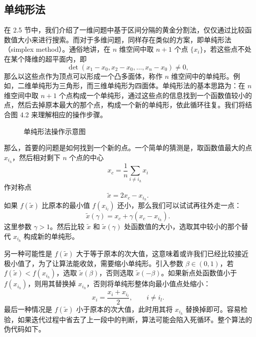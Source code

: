 \subsection{单纯形法}

在 2.5 节中，我们介绍了一维问题中基于区间分隔的黄金分割法，仅仅通过比较函数值大小来进行搜索。而对于多维问题，同样存在类似的方案，即单纯形法（simplex method）。通俗地讲，在 $n$ 维空间中取 $n+1$ 个点 $\{x_i\}$，若这些点不处在某个降维的超平面内，即
\[
\det(x_1-x_0,x_2-x_0,\ldots,x_n-x_0)\ne0,
\]
那么以这些点作为顶点可以形成一个凸多面体，称作 $n$ 维空间中的单纯形。例如，二维单纯形为三角形，而三维单纯形为四面体。单纯形法的基本思路为：在 $n$ 维空间中取 $n+1$ 个点构成一个单纯形，通过这些点的信息找到一个函数值较小的点，然后去掉原本最大的那个点，构成一个新的单纯形，依此循环往复。我们将结合图 4.2 来理解相应的操作步骤。

\begin{figure}[htbp]
\centering
{}
\caption{单纯形法操作示意图}
\label{fig:simplex-operations}
\end{figure}

那么，首要的问题是如何找到一个新的点。一个简单的猜测是，取函数值最大的点 $x_{i_h}$，然后相对剩下 $n$ 个点的中心
\[
x_c=\frac1n\sum_{i\ne i_h}x_i
\]
作对称点
\begin{equation}
\tilde x=2x_c-x_{i_h}.
\tag{4.1.25}
\end{equation}
如果 $f(\tilde x)$ 比原本的最小值 $f(x_{i_l})$ 还小，那么我们可以试试再往外走一点：
\begin{equation}
\tilde x(\gamma)=x_c+\gamma(x_c-x_{i_h}).
\tag{4.1.26}
\end{equation}
这里参数 $\gamma>1$。然后比较 $\tilde x$ 和 $\tilde x(\gamma)$ 处函数值的大小，选取其中较小的那个替代 $x_{i_h}$ 构成新的单纯形。

另一种可能性是 $f(\tilde x)$ 大于等于原本的次大值，这意味着或许我们已经比较接近极小值了，为了让算法能收敛，需要缩小单纯形。引入参数 $\beta\in(0,1)$，若 $f(\tilde x)<f(x_{i_h})$，选取 $\tilde x(\beta)$，否则选取 $\tilde x(-\beta)$。如果新点处函数值小于 $f(x_{i_h})$，则用其替换掉 $x_{i_h}$，否则将单纯形整体向最小值点处缩小：
\begin{equation}
x_i=\frac{x_i+x_{i_l}}{2},\qquad i\ne i_l.
\tag{4.1.27}
\end{equation}
最后一种情况是 $f(\tilde x)$ 小于原本的次大值，此时用其将 $x_{i_h}$ 替换掉即可。容易检验，如果迭代过程中省去了上一段中的判断，算法可能会陷入死循环。整个算法的伪代码如下。

